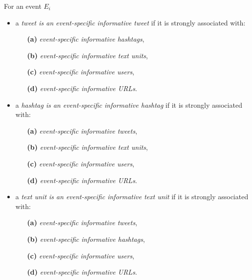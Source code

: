 For an event $E_{i}$ 
\begin{itemize} 
\item a \textit{tweet is an event-specific informative tweet} if it is strongly associated with:
\begin{itemize}
\item[\textbf{(a)}] \textit{event-specific informative hashtags}, 
\item[\textbf{(b)}] \textit{event-specific informative text units}, 
\item[\textbf{(c)}] \textit{event-specific informative users},
\item[\textbf{(d)}] \textit{event-specific informative URLs}. 
\end{itemize}
\end{itemize}

\begin{itemize} 
\item a \textit{hashtag is an event-specific informative hashtag} if it is strongly associated with:
\begin{itemize}
\item[\textbf{(a)}] \textit{event-specific informative tweets},
\item[\textbf{(b)}] \textit{event-specific informative text units},
\item[\textbf{(c)}] \textit{event-specific informative users},
\item[\textbf{(d)}] \textit{event-specific informative URLs}.
\end{itemize}
\end{itemize}

\begin{itemize} 
\item a \textit{text unit is an event-specific informative text unit} if it is strongly associated with:
\begin{itemize}
\item[\textbf{(a)}] \textit{event-specific informative tweets}, 
\item[\textbf{(b)}] \textit{event-specific informative hashtags}, 
\item[\textbf{(c)}] \textit{event-specific informative users}, 
\item[\textbf{(d)}] \textit{event-specific informative URLs}. 
\end{itemize}
\end{itemize}

